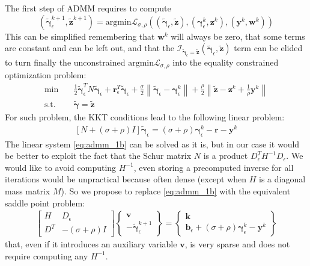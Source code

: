\documentclass{svproc}
\newcommand{\vect}[1]{\bm{#1}}
\newcommand{\norm}[1]{\left\lVert#1\right\rVert}
\begin{document}
The first step of ADMM requires to compute 
\[
(\tilde{\vect{\gamma}}_\epsilon^{k+1},\tilde{\vect{z}}^{k+1}) = \text{argmin} \mathcal{L}_{\sigma,\rho} \left((\tilde{\vect{\gamma}}_\epsilon,\tilde{\vect{z}}),(\vect{\gamma}_\epsilon^k,\vect{z}^k),(\vect{y}^k,\vect{w}^k)\right)
\] 
This can be simplified remembering that $\vect{w}^k$ will always be zero, that some terms are constant and can be left out, and that the $\mathcal{I}_{\tilde{\vect{\gamma}}_\epsilon = \tilde{\vect{z}}}(\tilde{\vect{\gamma}}_\epsilon,\tilde{\vect{z}})$ term can be elided to turn finally the unconstrained $\text{argmin}\mathcal{L}_{\sigma,\rho}$ into the equality constrained optimization problem:
\begin{subequations}
	\begin{align}
    \text{min} \quad  &  \frac{1}{2} \tilde{\vect{\gamma}}_\epsilon^T N \tilde{\vect{\gamma}}_\epsilon + \vect{r}^T_\epsilon \tilde{\vect{\gamma}}_\epsilon  
+ \frac{\sigma}{2} \norm{\tilde{\vect{\gamma}}_\epsilon - \vect{\gamma}_\epsilon^k}
+ \frac{\rho}{2} \norm{\tilde{\vect{z}} - \vect{z}^k + \frac{1}{\rho} \vect{y}^k} \\
	  \text{s.t.} \quad &  \tilde{\vect{\gamma}} = \tilde{\vect{z}}
	\end{align}
	\label{eq:admm_1a}
\end{subequations}
%
For such problem, the KKT conditions lead to the following linear problem:
\begin{align}
    \left[ N + (\sigma+\rho) I \right] \tilde{\vect{\gamma}}_\epsilon = (\sigma+\rho) \vect{\gamma}_\epsilon^k - \vect{r} - \vect{y}^k
		\label{eq:admm_1b}
\end{align}
%
The linear system \eqref{eq:admm_1b} can be solved as it is, but in our case it would be better to exploit the fact that the Schur matrix $N$ is a product $D_\epsilon^T H^{-1} D_\epsilon$. We would like to avoid computing $H^{-1}$, even storing a precomputed inverse for all iterations would be unpractical because often dense (except when $H$ is a diagonal mass matrix $M$). So we propose to replace \eqref{eq:admm_1b} with the equivalent saddle point problem:
\begin{subequations}
	\begin{align}
    \begin{bmatrix}
		 H   & D_\epsilon \\
		 D^T & -(\sigma+\rho) I
		\end{bmatrix}
		\begin{Bmatrix}
		 \vect{v}    \\
		 -\tilde{\vect{\gamma}}_\epsilon^{k+1} 
		\end{Bmatrix}
		=
		\begin{Bmatrix}
		 \vect{k} \\
		 \vect{b}_\epsilon + (\sigma+\rho) \vect{\gamma}_\epsilon^k-\vect{y}^k 
		\end{Bmatrix}
	\end{align}
	\label{eq:admm_1c}
\end{subequations}
that, even if it introduces an auxiliary variable $\vect{v}$, is very sparse and does not require computing any $H^{-1}$.
\end{document}
